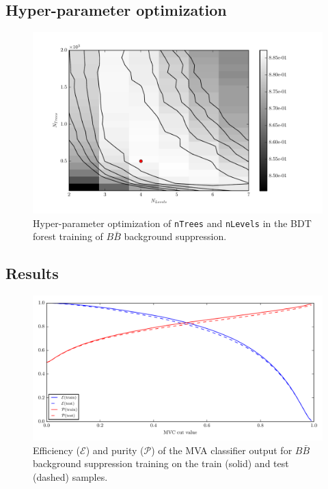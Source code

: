 \subsection*{Hyper-parameter optimization}

\begin{figure}[H]
\centering
\captionsetup{width=0.8\linewidth}
\includegraphics[width=\linewidth]{fig/addendums/BB01c_hpo}
\caption{Hyper-parameter optimization of \texttt{nTrees} and \texttt{nLevels} in the BDT forest training of $B\bar B$ background suppression.}
\end{figure}

\subsection*{Results}

\begin{figure}[H]
\centering
\captionsetup{width=0.8\linewidth}
\includegraphics[width=\linewidth]{fig/addendums/BB01c_effpur}
\caption{Efficiency ($\mathcal{E}$) and purity ($\mathcal{P}$) of the MVA classifier output for $B\bar B$ background suppression training on the train (solid) and test (dashed) samples.}
\end{figure}

